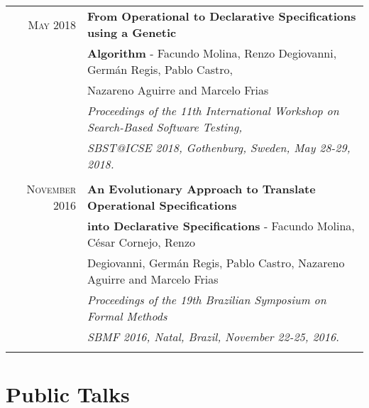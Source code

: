 \documentclass[a4paper,10pt]{article} %
\begin{document}
\begin{longtable}{rl}
\textsc{May} 2018  & \textbf{From Operational to Declarative Specifications using a Genetic} \\ & \textbf{Algorithm} - Facundo Molina, Renzo Degiovanni, Germán Regis, Pablo Castro,\\
& Nazareno Aguirre and Marcelo Frias \\
& \textit{Proceedings of the 11th International Workshop on Search-Based Software Testing,} \\
& \textit{SBST@ICSE 2018, Gothenburg, Sweden, May 28-29, 2018.} \\ & \\

\textsc{November} 2016 & \textbf{An Evolutionary Approach to Translate Operational Specifications} \\ & \textbf{into Declarative Specifications} - Facundo Molina, César Cornejo, Renzo \\
& Degiovanni, Germán Regis, Pablo Castro, Nazareno Aguirre and Marcelo Frias \\
& \textit{Proceedings of the 19th Brazilian Symposium on Formal Methods} \\ 
& \textit{SBMF 2016, Natal, Brazil, November 22-25, 2016.} \\ & \\

\end{longtable}

\section{Public Talks}
\end{document}
